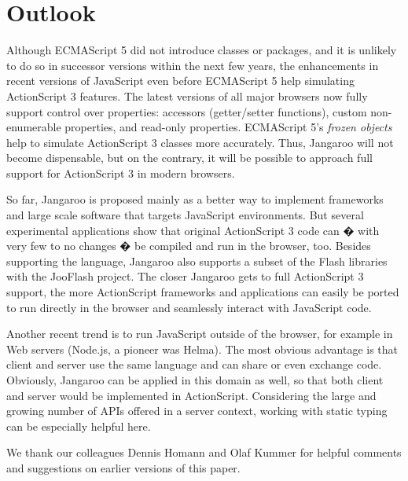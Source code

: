 \documentclass[10pt]{sigplanconf}
\begin{document}
\section{Outlook}

Although ECMAScript 5 did not introduce classes or packages, and it is unlikely to do so in successor versions within the next few years, the enhancements in recent versions of JavaScript even before ECMAScript 5 help simulating ActionScript 3 features. The latest versions of all major browsers now fully support control over properties: accessors (getter/setter functions), custom non-enumerable properties, and read-only properties. ECMAScript 5's \emph{frozen objects} help to simulate ActionScript 3 classes more accurately. Thus, Jangaroo will not become dispensable, but on the contrary, it will be possible to approach full support for ActionScript 3 in modern browsers. 

So far, Jangaroo is proposed mainly as a better way to implement frameworks and large scale software that targets JavaScript environments. But several experimental applications\citep{jangaroo-applications} show that original ActionScript 3 code can � with very few to no changes � be compiled and run in the browser, too. Besides supporting the language, Jangaroo also supports a subset of the Flash libraries with the JooFlash project\citep{jlwiki}. The closer Jangaroo gets to full ActionScript 3 support, the more ActionScript frameworks and applications can easily be ported to run directly in the browser and seamlessly interact with JavaScript code.

Another recent trend is to run JavaScript outside of the browser, for example in Web servers (Node.js\citep{nodejs}, a pioneer was Helma\citep{helma}). The most obvious advantage is that client and server use the same language and can share or even exchange code. Obviously, Jangaroo can be applied in this domain as well, so that both client and server would be implemented in ActionScript. Considering the large and growing number of APIs offered in a server context, working with static typing can be especially helpful here.

\appendix

\acks

We thank our colleagues Dennis Homann and Olaf Kummer for helpful comments and suggestions on earlier versions of this paper.


\softraggedright

\end{document}
